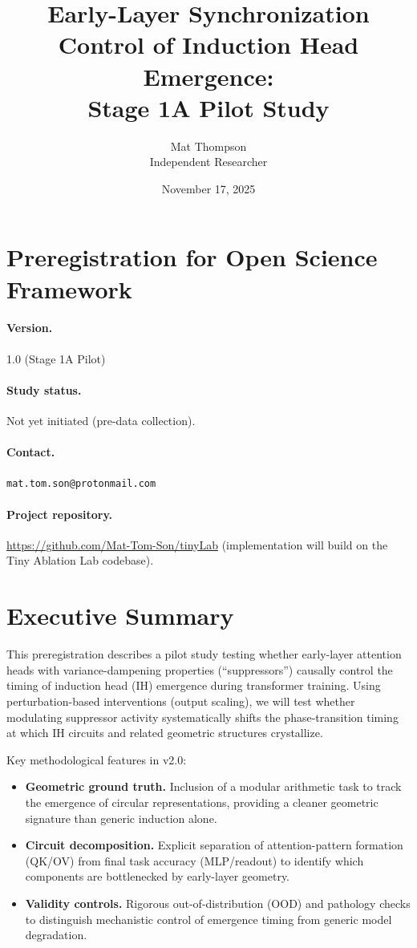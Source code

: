 \documentclass[11pt]{article}
\title{Early-Layer Synchronization Control of Induction Head Emergence:\\Stage 1A Pilot Study}
\author{Mat Thompson\\Independent Researcher}
\date{November 17, 2025}
\begin{document}
\maketitle

\section*{Preregistration for Open Science Framework}

\paragraph{Version.} 1.0 (Stage 1A Pilot)

\paragraph{Study status.} Not yet initiated (pre-data collection).

\paragraph{Contact.} \texttt{mat.tom.son@protonmail.com}

\paragraph{Project repository.} \url{https://github.com/Mat-Tom-Son/tinyLab} (implementation will build on the Tiny Ablation Lab codebase).

\section*{Executive Summary}

This preregistration describes a pilot study testing whether early-layer attention heads with variance-dampening properties (``suppressors'') causally control the timing of induction head (IH) emergence during transformer training. Using perturbation-based interventions (output scaling), we will test whether modulating suppressor activity systematically shifts the phase-transition timing at which IH circuits and related geometric structures crystallize.

Key methodological features in v2.0:
\begin{itemize}
  \item \textbf{Geometric ground truth.} Inclusion of a modular arithmetic task to track the emergence of circular representations, providing a cleaner geometric signature than generic induction alone.
  \item \textbf{Circuit decomposition.} Explicit separation of attention-pattern formation (QK/OV) from final task accuracy (MLP/readout) to identify which components are bottlenecked by early-layer geometry.
  \item \textbf{Validity controls.} Rigorous out-of-distribution (OOD) and pathology checks to distinguish mechanistic control of emergence timing from generic model degradation.
\end{itemize}
\end{document}
